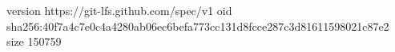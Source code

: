 version https://git-lfs.github.com/spec/v1
oid sha256:40f7a4c7e0c4a4280ab06ec6befa773cc131d8fcce287c3d81611598021c87e2
size 150759
